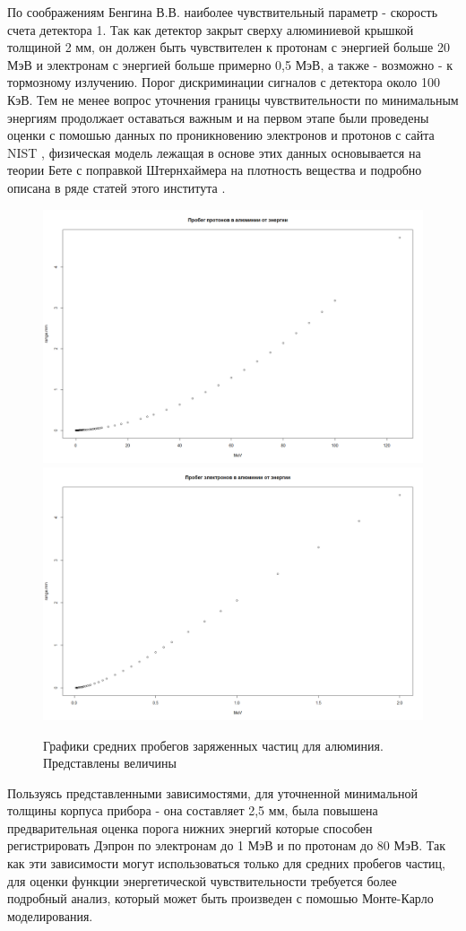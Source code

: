 По соображениям Бенгина В.В. наиболее чувствительный параметр - скорость счета 
детектора 1. Так как детектор закрыт сверху алюминиевой крышкой толщиной 2 мм, 
он должен быть чувствителен к протонам с энергией больше 20 МэВ и электронам с 
энергией больше примерно 0,5 МэВ, а также - возможно - к тормозному излучению. 
Порог дискриминации сигналов с детектора около 100 КэВ.
Тем не менее вопрос уточнения границы чувствительности по минимальным энергиям 
продолжает оставаться важным и на первом этапе были проведены оценки с помошью 
данных  по проникновению электронов и протонов с сайта NIST \cite{NIST}, 
физическая модель  лежащая в основе этих данных основывается на теории 
Бете\cite{Bethe1930} с поправкой Штернхаймера \cite{Sternheimer1952} на 
плотность вещества  и подробно описана в 
ряде статей этого института \cite{Bichsel1992,Ashley1972}.
\begin{figure}[H]
	\centering
	\includegraphics[width=0.9\linewidth]{images/Rplot01}
	\includegraphics[width=0.9\linewidth]{images/Rplot02}
	\caption{Графики средних пробегов заряженных частиц для алюминия. 
	Представлены величины }
	\label{fig:rplot01}
\end{figure}

Пользуясь представленными зависимостями, для уточненной минимальной толщины 
корпуса прибора - она составляет 2,5 мм, была повышена предварительная оценка  
порога нижних энергий которые способен регистрировать Дэпрон по электронам до 1 
МэВ и по протонам до 80 МэВ. Так как эти зависимости могут использоваться 
только для средних пробегов частиц, для оценки функции энергетической 
чувствительности требуется более подробный анализ, который может быть 
произведен с помошью Монте-Карло моделирования.

